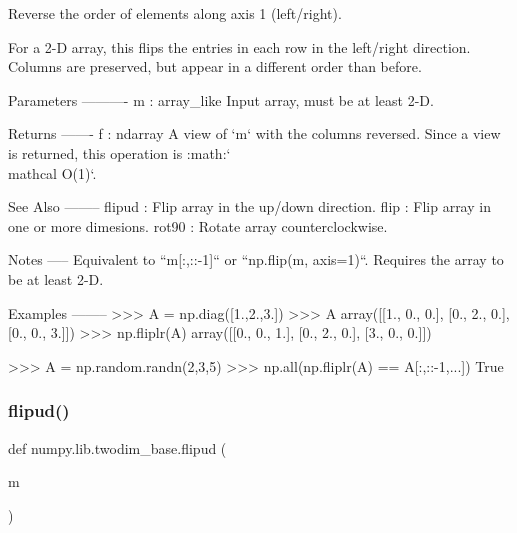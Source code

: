 \begin{DoxyVerb}Reverse the order of elements along axis 1 (left/right).

For a 2-D array, this flips the entries in each row in the left/right
direction. Columns are preserved, but appear in a different order than
before.

Parameters
----------
m : array_like
    Input array, must be at least 2-D.

Returns
-------
f : ndarray
    A view of `m` with the columns reversed.  Since a view
    is returned, this operation is :math:`\\mathcal O(1)`.

See Also
--------
flipud : Flip array in the up/down direction.
flip : Flip array in one or more dimesions.
rot90 : Rotate array counterclockwise.

Notes
-----
Equivalent to ``m[:,::-1]`` or ``np.flip(m, axis=1)``.
Requires the array to be at least 2-D.

Examples
--------
>>> A = np.diag([1.,2.,3.])
>>> A
array([[1.,  0.,  0.],
       [0.,  2.,  0.],
       [0.,  0.,  3.]])
>>> np.fliplr(A)
array([[0.,  0.,  1.],
       [0.,  2.,  0.],
       [3.,  0.,  0.]])

>>> A = np.random.randn(2,3,5)
>>> np.all(np.fliplr(A) == A[:,::-1,...])
True\end{DoxyVerb}
 \mbox{\label{namespacenumpy_1_1lib_1_1twodim__base_a33ed22c6334be41a34f97257be3ff2ed}} 
\subsubsection{\texorpdfstring{flipud()}{flipud()}}
{\footnotesize\ttfamily def numpy.\+lib.\+twodim\+\_\+base.\+flipud (\begin{DoxyParamCaption}\item[{}]{m }\end{DoxyParamCaption})}

